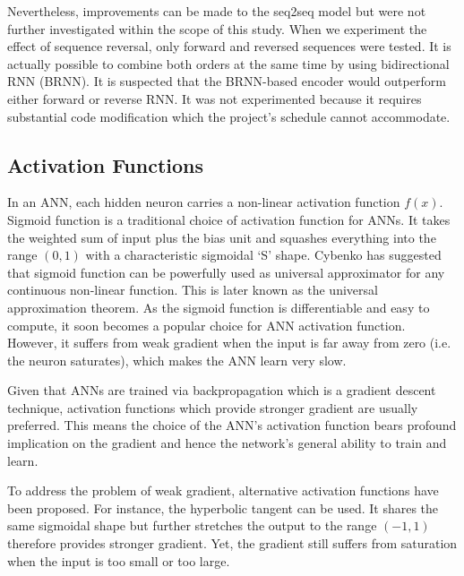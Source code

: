 \documentclass[11pt]{article} %
\theoremstyle{plain}
\theoremstyle{definition}
\begin{document}
Nevertheless, improvements can be made to the seq2seq model but were not further investigated within the scope of this study. When we experiment the effect of sequence reversal, only forward and reversed sequences were tested. It is actually possible to combine both orders at the same time by using bidirectional RNN (BRNN). It is suspected that the BRNN-based encoder would outperform either forward or reverse RNN. It was not experimented because it requires substantial code modification which the project's schedule cannot accommodate.

\newpage
\begin{appendices}
	
	\section{Activation Functions}
	
	In an ANN, each hidden neuron carries a non-linear activation function \(f(x)\). Sigmoid function is a traditional choice of activation function for ANNs. It takes the weighted sum of input plus the bias unit and squashes everything into the range \((0,1)\) with a characteristic sigmoidal ‘S’ shape. Cybenko \cite{cybenko} has suggested that sigmoid function can be powerfully used as universal approximator for any continuous non-linear function. This is later known as the universal approximation theorem. As the sigmoid function is differentiable and easy to compute, it soon becomes a popular choice for ANN activation function. However, it suffers from weak gradient when the input is far away from zero (i.e. the neuron saturates), which makes the ANN learn very slow. 
	
	Given that ANNs are trained via backpropagation which is a gradient descent technique, activation functions which provide stronger gradient are usually preferred. This means the choice of the ANN’s activation function bears profound implication on the gradient and hence the network’s general ability to train and learn. 
	
	To address the problem of weak gradient, alternative activation functions have been proposed. For instance, the hyperbolic tangent can be used. It shares the same sigmoidal shape but further stretches the output to the range \((-1,1)\) therefore provides stronger gradient. Yet, the gradient still suffers from saturation when the input is too small or too large.
	

\end{appendices}
\end{document}
